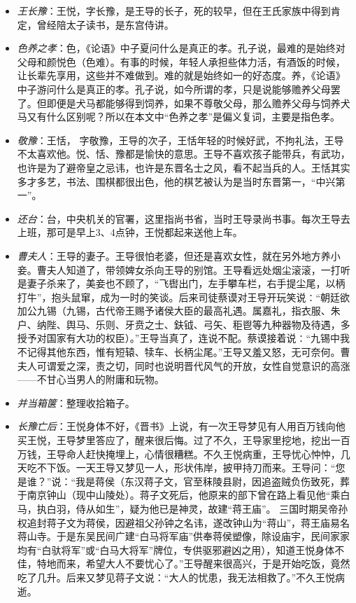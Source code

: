 \documentclass[]{book}
\providecommand{\tightlist}{%
  \setlength{\itemsep}{0pt}\setlength{\parskip}{0pt}}
\begin{document}
\begin{itemize}
\tightlist
\item
  \emph{王长豫}：王悦，字长豫，是王导的长子，死的较早，但在王氏家族中得到肯定，曾经陪太子读书，是东宫侍讲。
\item
  \emph{色养之孝}：色，《论语》中子夏问什么是真正的孝。孔子说，最难的是始终对父母和颜悦色（色难）。有事的时候，年轻人承担些体力活，有酒饭的时候，让长辈先享用，这些并不难做到。难的就是始终如一的好态度。养，《论语》中子游问什么是真正的孝。孔子说，如今所谓的孝，只是说能够赡养父母罢了。但即便是犬马都能够得到饲养，如果不尊敬父母，那么赡养父母与饲养犬马又有什么区别呢？所以在本文中``色养之孝''是偏义复词，主要是指色孝。
\item
  \emph{敬豫}：王恬，
  字敬豫，王导的次子，王恬年轻的时候好武，不拘礼法，王导不太喜欢他。悦、恬、豫都是愉快的意思。王导不喜欢孩子能带兵，有武功，也许是为了避帝皇之忌讳，也许是东晋名士之风，看不起当兵的人。王恬其实多才多艺，书法、围棋都很出色，他的棋艺被认为是当时东晋第一，``中兴第一''。
\item
  \emph{还台}：台，中央机关的官署，这里指尚书省，当时王导录尚书事。每次王导去上班，那可是早上3、4点钟，王悦都起来送他上车。
\item
  \emph{曹夫人}：王导的妻子。王导很怕老婆，但还是喜欢女性，就在另外地方养小妾。曹夫人知道了，带领婢女杀向王导的别馆。王导看远处烟尘滚滚，一打听是妻子杀来了，美妾也不顾了，``飞辔出门，左手攀车栏，右手提尘尾，以柄打牛''，抱头鼠窜，成为一时的笑谈。后来司徒蔡谟对王导开玩笑说∶``朝廷欲加公九锡（九锡，古代帝王赐予诸侯大臣的最高礼遇。属嘉礼，指衣服、朱户、纳陛、舆马、乐则、牙贲之士、鈇钺、弓矢、秬鬯等九种器物及待遇，多授予对国家有大功的权臣）。''王导当真了，连说不配。蔡谟接着说∶``九锡中我不记得其他东西，惟有短辕、犊车、长柄尘尾。''王导又羞又怒，无可奈何。曹夫人可谓爱之深，责之切，同时也说明晋代风气的开放，女性自觉意识的高涨------不甘心当男人的附庸和玩物。
\item
  \emph{并当箱箧}：整理收拾箱子。
\item
  \emph{长豫亡后}：王悦身体不好，《晋书》上说，有一次王导梦见有人用百万钱向他买王悦，王导梦里答应了，醒来很后悔。过了不久，王导家里挖地，挖出一百万钱，王导命人赶快掩埋上，心情很糟糕。不久王悦病重，王导忧心忡忡，几天吃不下饭。一天王导又梦见一人，形状伟岸，披甲持刀而来。王导问：``您是谁？''说：``我是蒋侯（东汉蒋子文，官至秣陵县尉，因追盗贼负伤致死，葬于南京钟山（现中山陵处）。蒋子文死后，他原来的部下曾在路上看见他``乘白马，执白羽，侍从如生''，疑为他已是神灵，故建``蒋王庙''。
  三国时期吴帝孙权追封蒋子文为蒋侯，因避祖父孙钟之名讳，遂改钟山为``蒋山''，蒋王庙易名蒋山寺。于是东吴民间广建``白马将军庙''供奉蒋侯塑像，除设庙宇，民间家家均有``白驮将军''或``白马大将军''牌位，专供驱邪避凶之用），知道王悦身体不佳，特地而来，希望大人不要忧心了。''王导醒来很高兴，于是开始吃饭，竟然吃了几升。后来又梦见蒋子文说：``大人的忧患，我无法相救了。''不久王悦病逝。
\end{itemize}
\end{document}
